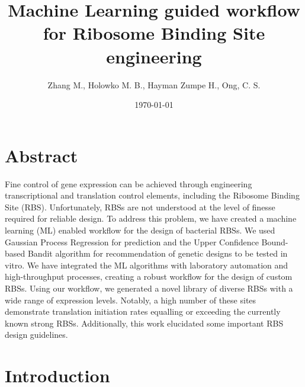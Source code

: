 \documentclass{article}
\title{Machine Learning guided workflow for Ribosome Binding Site engineering}
\author{Zhang M., Holowko M. B., Hayman Zumpe H., Ong, C. S.}
\date{\today{}}
\begin{document}
\maketitle

\section*{Abstract}

Fine control of gene expression can be achieved through engineering transcriptional and translation control elements, including the Ribosome Binding Site (RBS).
Unfortunately, RBSs are not understood at the level of finesse required for reliable design. 
To address this problem, we have created a machine learning (ML) enabled workflow for the design of bacterial RBSs.
We used Gaussian Process Regression for prediction and the Upper Confidence Bound-based Bandit algorithm for recommendation of genetic designs to be tested in vitro.
We have integrated the ML algorithms with laboratory automation and high-throughput processes, creating a robust workflow for the design of custom RBSs.
Using our workflow, we generated a novel library of diverse RBSs with a wide range of expression levels.
Notably, a high number of these sites demonstrate translation initiation rates equalling or exceeding the currently known strong RBSs.
Additionally, this work elucidated some important RBS design guidelines.

\section{Introduction}
\end{document}
